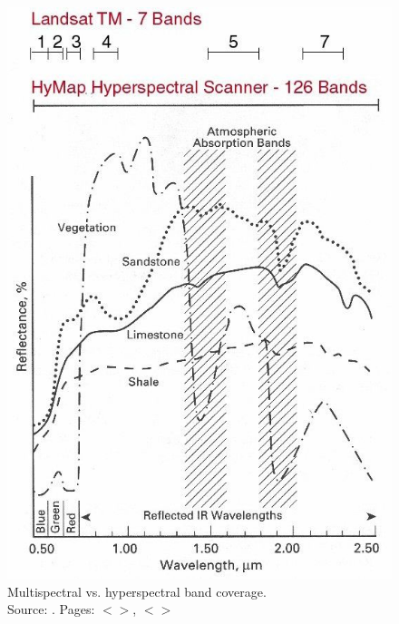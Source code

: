 \documentclass[11pt]{article}
\begin{document}
\begin{figure}
	\centering
	\includegraphics[scale=0.30]{Fig-14.jpg}
	\caption{Multispectral vs. hyperspectral band coverage. \\ Source: \cite{Sabins97}\label{Sabins97}. Pages: $<$\pageref{page-20}$>$,  $<$\pageref{page-18}$>$}
	\label{fig:2.5}
\end{figure}
\end{document}
